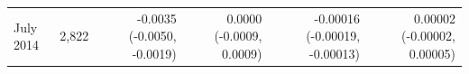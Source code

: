\begin{tabular}{lrrrrr}
July 2014 & 2,822 & -0.0035 (-0.0050, -0.0019) & 0.0000 (-0.0009, 0.0009) & -0.00016 (-0.00019, -0.00013) & 0.00002 (-0.00002, 0.00005) \\

\end{tabular}
